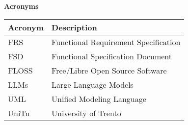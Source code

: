 \textcolor{RFIGreen}{\Large\bf Acronyms}

\begin{center}

\begin{tabular}{|p{5cm}|p{9cm}|}
\hline
{\small\bf Acronym} & {\small\bf Description}\\
\hline

FRS & Functional Requirement Specification\\
FSD & Functional Specification Document\\
FLOSS & Free/Libre Open Source Software\\
LLMs & Large Language Models\\
UML & Unified Modeling Language\\
UniTn & University of Trento\\

\hline

\end{tabular}

\end{center}

\newpage

